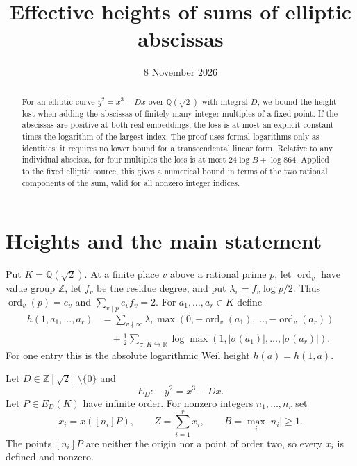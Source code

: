 \documentclass[11pt,a4paper]{article}
\title{Effective heights of sums of elliptic abscissas}
\author{}\date{8 November 2026}
\newcommand{\Q}{\mathbb Q}\newcommand{\Z}{\mathbb Z}
\newcommand{\ord}{\operatorname{ord}}
\begin{document}
\maketitle
\begin{abstract}
For an elliptic curve $y^2=x^3-Dx$ over $\Q(\sqrt2)$ with
integral $D$, we bound the height lost when adding the
abscissas of finitely many integer multiples of a fixed point.
If the abscissas are positive at both real embeddings, the
loss is at most an explicit constant times the logarithm of
the largest index. The proof uses formal logarithms only as
identities: it requires no lower bound for a transcendental
linear form. Relative to any individual abscissa, for four
multiples the loss is at most $24\log B+\log864$.
Applied to the fixed elliptic source,
this gives a numerical bound in terms of the two rational
components of the sum, valid for all nonzero integer indices.
\end{abstract}

\section{Heights and the main statement}

Put $K=\Q(\sqrt2)$. At a finite place $v$ above a rational
prime $p$, let $\ord_v$ have value group $\Z$, let $f_v$ be
the residue degree, and put
$\lambda_v=f_v\log p/2$. Thus $\ord_v(p)=e_v$ and
$\sum_{v\mid p}e_vf_v=2$. For $a_1,\ldots,a_r\in K$ define
\begin{align*}
 h(1,a_1,\ldots,a_r)
 &=\sum_{v\nmid\infty}\lambda_v
          \max(0,-\ord_v(a_1),\ldots,-\ord_v(a_r))
 \\&\quad+\frac12\sum_{\sigma:K\hookrightarrow\mathbb R}
          \log\max(1,|\sigma(a_1)|,\ldots,|\sigma(a_r)|).
\end{align*}
For one entry this is the absolute logarithmic Weil height
$h(a)=h(1,a)$.

Let $D\in\Z[\sqrt2]\setminus\{0\}$ and
\[
 E_D:\quad y^2=x^3-Dx.
\]
Let $P\in E_D(K)$ have infinite order. For nonzero integers
$n_1,\ldots,n_r$ set
\[
 x_i=x([n_i]P),\qquad Z=\sum_{i=1}^r x_i,
 \qquad B=\max_i|n_i|\ge1.
\]
The points $[n_i]P$ are neither the origin nor a point of
order two, so every $x_i$ is defined and nonzero.
\end{document}
